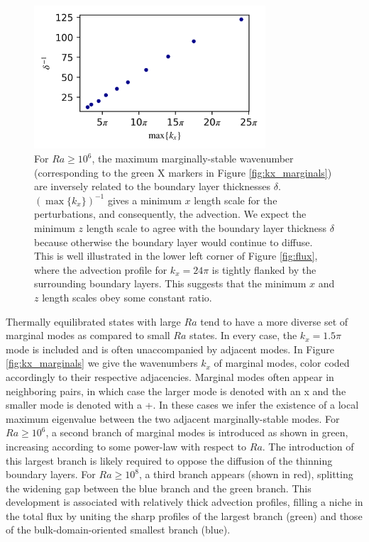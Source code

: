 \documentclass[reprint,amsmath,amssymb,aps]{revtex4-1}
\begin{document}
\begin{figure}[h]
    \centering
    \includegraphics[width=3.4in]{del_kx_inv.png}
    \caption{For $Ra \geq 10^6$, the maximum marginally-stable wavenumber (corresponding to the green X markers in Figure \ref{fig:kx_marginals}) are inversely related to the boundary layer thicknesses $\delta$. $(\max \{ k_x \})^{-1}$ gives a minimum $x$ length scale for the perturbations, and consequently, the advection. We expect the minimum $z$ length scale to agree with the boundary layer thickness $\delta$ because otherwise the boundary layer would continue to diffuse. This is well illustrated in the lower left corner of Figure \ref{fig:flux}, where the advection profile for $k_x = 24\pi$ is tightly flanked by the surrounding boundary layers. This suggests that the minimum $x$ and $z$ length scales obey some constant ratio.}
    \label{fig:del_inv}
\end{figure}

Thermally equilibrated states with large $Ra$ tend to have a more diverse set of marginal modes as compared to small $Ra$ states. In every case, the $k_x = 1.5\pi$ mode is included and is often unaccompanied by adjacent modes. In Figure \ref{fig:kx_marginals} we give the wavenumbers $k_x$ of marginal modes, color coded accordingly to their respective adjacencies. Marginal modes often appear in neighboring pairs, in which case the larger mode is denoted with an x and the smaller mode is denoted with a +. In these cases we infer the existence of a local maximum eigenvalue between the two adjacent marginally-stable modes. For $Ra \geq 10^6$, a second branch of marginal modes is introduced as shown in green, increasing according to some power-law with respect to $Ra$. The introduction of this largest branch is likely required to oppose the diffusion of the thinning boundary layers. For $Ra \geq 10^8$, a third branch appears (shown in red), splitting the widening gap between the blue branch and the green branch. This development is associated with relatively thick advection profiles, filling a niche in the total flux by uniting the sharp profiles of the largest branch (green) and those of the bulk-domain-oriented smallest branch (blue).
\end{document}
